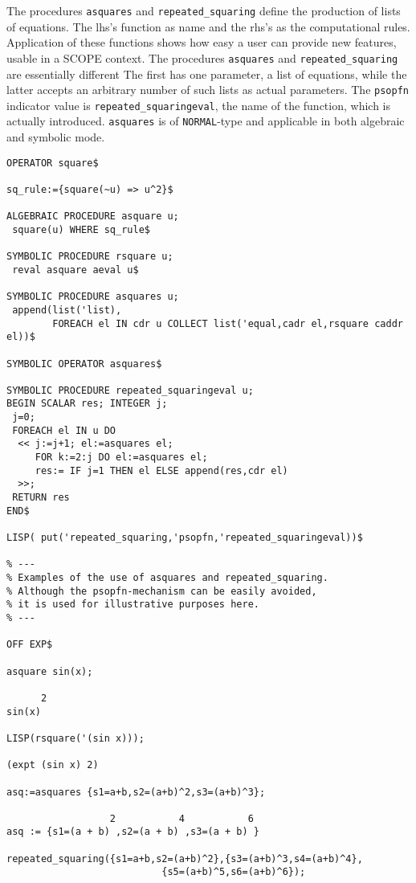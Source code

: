\example\label{ex:4.1.1}

The procedures {\tt asquares} and {\tt repeated\_squaring}
define the production of
lists of equations. The lhs's function as name and the rhs's as
the computational rules.
Application of these functions shows how easy a user can provide new features,
usable in a SCOPE context.
The procedures {\tt asquares} and {\tt repeated\_squaring} are essentially
different The first has one parameter, a list of equations, while the latter
accepts an arbitrary number of such lists as actual parameters.
The {\tt psopfn} indicator value is
{\tt repeated\_squaringeval}, the name of the function, which is actually
introduced. {\tt asquares} is of {\tt NORMAL}-type and applicable in both
algebraic and symbolic mode.
{\small
\begin{verbatim}
OPERATOR square$

sq_rule:={square(~u) => u^2}$

ALGEBRAIC PROCEDURE asquare u;
 square(u) WHERE sq_rule$

SYMBOLIC PROCEDURE rsquare u;
 reval asquare aeval u$

SYMBOLIC PROCEDURE asquares u;
 append(list('list),
        FOREACH el IN cdr u COLLECT list('equal,cadr el,rsquare caddr el))$

SYMBOLIC OPERATOR asquares$

SYMBOLIC PROCEDURE repeated_squaringeval u;
BEGIN SCALAR res; INTEGER j;
 j=0;
 FOREACH el IN u DO
  << j:=j+1; el:=asquares el;
     FOR k:=2:j DO el:=asquares el;
     res:= IF j=1 THEN el ELSE append(res,cdr el)
  >>;
 RETURN res
END$

LISP( put('repeated_squaring,'psopfn,'repeated_squaringeval))$

% ---
% Examples of the use of asquares and repeated_squaring.
% Although the psopfn-mechanism can be easily avoided,
% it is used for illustrative purposes here.
% ---

OFF EXP$

asquare sin(x);

      2
sin(x)

LISP(rsquare('(sin x)));

(expt (sin x) 2)

asq:=asquares {s1=a+b,s2=(a+b)^2,s3=(a+b)^3};

                  2           4           6
asq := {s1=(a + b) ,s2=(a + b) ,s3=(a + b) }

repeated_squaring({s1=a+b,s2=(a+b)^2},{s3=(a+b)^3,s4=(a+b)^4},
                           {s5=(a+b)^5,s6=(a+b)^6});


\end{verbatim}}
